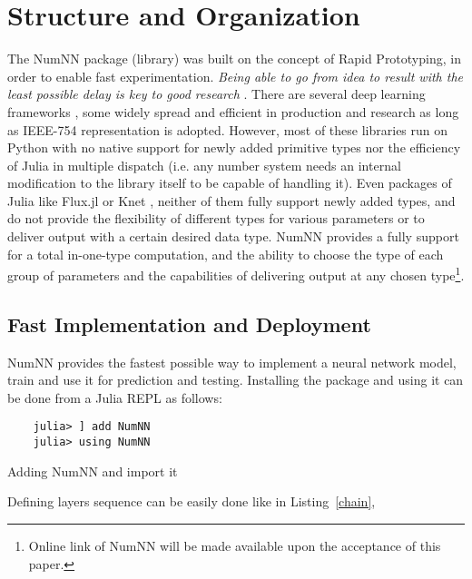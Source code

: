 \section{Structure and Organization}
The NumNN  package (library) was built on the concept of Rapid Prototyping, in order to enable fast experimentation. \emph{Being able to go from idea to result with the least possible delay is key to good research} \cite{Keras}. There are several deep learning frameworks \cite{Abadi2016,Collet2015,Jia2014,Paszke2017,PyTorch2019}, some widely spread and efficient in production and research as long as IEEE-754 representation is adopted. However, most of these libraries run on Python with no native support for newly added primitive types nor the efficiency of Julia in multiple dispatch (i.e. any number system needs an internal modification to the library itself to be capable of handling it). Even packages of Julia like Flux.jl \cite{Flux.jl-2018,Innes2018} or Knet \cite{Yuret2016k}, neither of them fully support newly added types, and do not provide the flexibility of different types for various parameters or to deliver output with a certain desired data type. NumNN provides a fully support for a total in-one-type computation, and the ability to choose the type of each group of parameters and the capabilities of delivering output at any chosen type\footnote{Online link of NumNN will be made available upon the acceptance  of this paper.}.

\subsection{Fast Implementation and Deployment}

NumNN provides the fastest possible way to implement a neural network model, train and use it for prediction and testing. Installing the package and using it can be done from a Julia REPL as follows:

\begin{listing}[H]
	\begin{verbatim}
	julia> ] add NumNN
	julia> using NumNN
	\end{verbatim}
	\caption{Adding NumNN and import it}\label{addimport}
\end{listing}

Defining layers sequence can be easily done like in Listing~\ref{chain},


